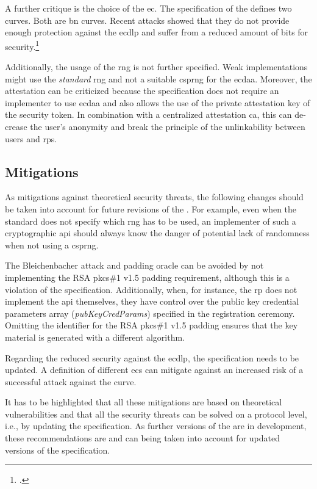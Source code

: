A further critique is the choice of the \gls{ec}. The specification of the \wa{} defines two curves. Both are \gls{bn} curves. Recent attacks showed that they do not provide enough protection against the \gls{ecdlp} and suffer from a reduced amount of bits for security.\footcites[See][562]{10.1007/978-3-662-53018-4_20}

Additionally, the usage of the \gls{rng} is not further specified. Weak implementations might use the \textit{standard} \gls{rng} and not a suitable \gls{csprng} for the \gls{ecdaa}. Moreover, the attestation can be criticized because the specification does not require an implementer to use \gls{ecdaa} and also allows the use of the private attestation key of the security token. In combination with a centralized attestation \gls{ca}, this can de-crease the user's anonymity and break the principle of the unlinkability between users and \glspl{rp}.

\subsection{Mitigations}

As mitigations against theoretical security threats, the following changes should be taken into account for future revisions of the \wa{}. For example, even when the standard does not specify which \gls{rng} has to be used, an implementer of such a cryptographic \gls{api} should always know the danger of potential lack of randomness when not using a \gls{csprng}. 

The Bleichenbacher attack and padding oracle can be avoided by not implementing the RSA \gls{pkcs}\#1 v1.5 padding requirement, although this is a violation of the specification. Additionally, when, for instance, the \gls{rp} does not implement the \gls{api} themselves, they have control over the public key credential parameters array (\textit{pubKeyCredParams}) specified in the registration ceremony. Omitting the identifier for the RSA \gls{pkcs}\#1 v1.5 padding ensures that the key material is generated with a different algorithm.

Regarding the reduced security against the \gls{ecdlp}, the specification needs to be updated. A definition of different \glspl{ec} can mitigate against an increased risk of a successful attack against the curve.

It has to be highlighted that all these mitigations are based on theoretical vulnerabilities and that all the security threats can be solved on a protocol level, i.e., by updating the specification. As further versions of the \wa{} are in development, these recommendations are and can being taken into account for updated versions of the specification.
